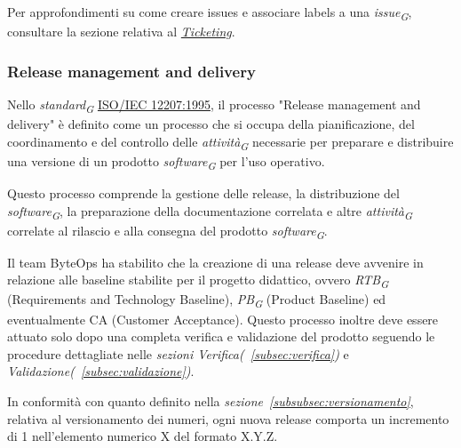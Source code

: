 Per approfondimenti su come creare issues e associare labels a una \textit{issue}\textsubscript{\textit{G}}, consultare la sezione relativa al \hyperlink{par:ticketing}{\textit{Ticketing}}.

\subsubsection{Release management and delivery}
Nello \textit{standard}\textsubscript{\textit{G}} \href{https://www.math.unipd.it/~tullio/IS-1/2009/Approfondimenti/ISO_12207-1995.pdf}{ISO/IEC 12207:1995}, il processo "Release management and delivery" è definito come un processo che si occupa della pianificazione, del coordinamento e del controllo delle \textit{attività}\textsubscript{\textit{G}} necessarie per preparare e distribuire una versione di un prodotto \textit{software}\textsubscript{\textit{G}} per l'uso operativo.

Questo processo comprende la gestione delle release, la distribuzione del \textit{software}\textsubscript{\textit{G}}, la preparazione della documentazione correlata e altre \textit{attività}\textsubscript{\textit{G}} correlate al rilascio e alla consegna del prodotto \textit{software}\textsubscript{\textit{G}}.

\vspace{0.2cm}

Il team ByteOps ha stabilito che la creazione di una release deve avvenire in relazione alle baseline stabilite per il progetto didattico, ovvero \textit{RTB}\textsubscript{\textit{G}} (Requirements and Technology Baseline), \textit{PB}\textsubscript{\textit{G}} (Product Baseline) ed eventualmente CA (Customer Acceptance). Questo processo inoltre deve essere attuato solo dopo una completa verifica e validazione del prodotto seguendo le procedure dettagliate nelle \textit{sezioni Verifica(~\ref{subsec:verifica})} e \textit{Validazione(~\ref{subsec:validazione})}.

\vspace{0.2cm}

In conformità con quanto definito nella \textit{sezione~\ref{subsubsec:versionamento}}, relativa al versionamento dei numeri, ogni nuova release comporta un incremento di 1 nell'elemento numerico X del formato X.Y.Z.

